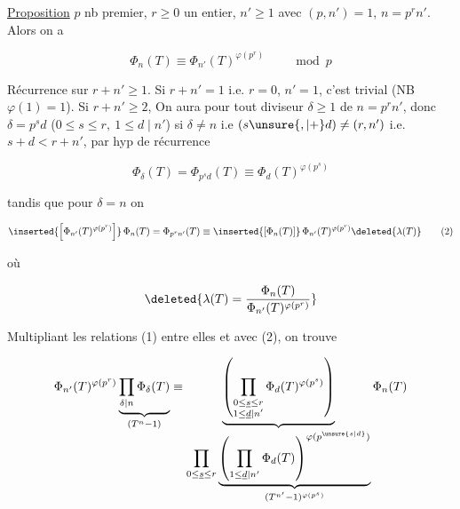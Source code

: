 
\uline{Proposition}  $p$ nb premier, $r\geq 0$ un entier, $n'\geq 1$ avec $(p,n')=1$, $n=p^rn'$. Alors on a

\[
\Phi_n(T)\equiv\Phi_{n'}(T)^{\varphi(p^r)}\qquad\bmod p
\]

Récurrence sur $r+n'\geq1$. Si $r+n'=1$ i.e. $r=0$, $n'=1$, c'est trivial (NB $\varphi(1)=1$). Si $r+n'\geq2$, On aura pour tout diviseur $\delta\geq1$ de $n=p^rn'$, donc $\delta=p^sd$ ($0\leq s\leq r,\ 1\leq d\mid n'$) si $\delta\ne n$ i.e $(s\unsure{,|+}d)\ne(r,n')$ i.e. $s+d<r+n'$, par hyp de récurrence

\[
\Phi_\delta(T)=\Phi_{p^sd}(T)\equiv\Phi_d(T)^{\varphi(p^s)}\tag*{(1)}
\]

tandis que pour $\delta=n$ on 

\[
\inserted{\left[\Phi_{n'}(T)^{\varphi(p^r)}\right]}\,\Phi_n(T)=\Phi_{p^rn'}(T)\equiv\inserted{[\Phi_n(T)]}\,\Phi_{n'}(T)^{\varphi(p^r)}\deleted{\lambda(T)}\tag*{(2)}
\]

où

\[
\deleted{\lambda(T)=\frac{\Phi_n(T)}{\Phi_{n'}(T)^{\varphi(p^r)}}}
\]

Multipliant les relations (1) entre elles et avec (2), on trouve

\[
\Phi_{n'}(T)^{\varphi(p^r)}
\underbrace{\prod_{\delta\mid n}\Phi_\delta(T)}_{(T^n-1)}
\equiv\underbrace{\left(\prod_{\substack{0\leq\underline{s}\leq r\\1\leq\underline{d}\mid n'}}\Phi_d(T)^{\varphi(p^s)}\right)}_{
\displaystyle\prod_{0\leq\underline{s}\leq r}\underbrace{\left(\prod_{1\leq\underline{d}\mid n'}\Phi_d(T)\right)^{\varphi(p^{\unsure{s|d}})}}_{(T^{n'}-1)^{\varphi(p^s)}}}\Phi_n(T)
\]

